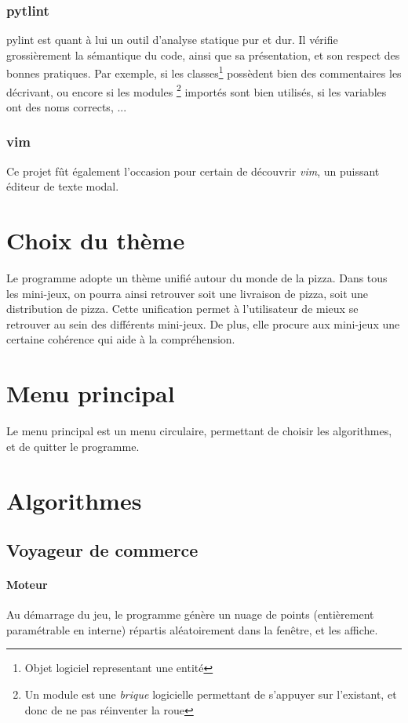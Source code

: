         \subsubsection{pytlint} pylint est quant à lui un outil d'analyse
            statique pur et dur. Il vérifie grossièrement la sémantique du code,
            ainsi que sa présentation, et son respect des bonnes pratiques.
            Par exemple, si les classes\footnote{Objet logiciel representant une entité}
            possèdent bien des commentaires les décrivant, ou encore si les modules
            \footnote{Un module est une \emph{brique} logicielle permettant
            de s'appuyer sur l'existant, et donc de ne pas réinventer la roue}
            importés sont bien utilisés, si les variables ont des noms corrects, ...
        \subsubsection{vim}
            Ce projet fût également l'occasion pour certain de découvrir \emph{vim},
            un puissant éditeur de texte modal.

\section{Choix du thème}
Le programme adopte un thème unifié autour du monde de la pizza. Dans tous les mini-jeux, on pourra
ainsi retrouver soit une livraison de pizza, soit une distribution de pizza. Cette unification permet à
l'utilisateur de mieux se retrouver au sein des différents mini-jeux. De plus, elle procure aux mini-jeux
une certaine cohérence qui aide à la compréhension.

\section{Menu principal}
    Le menu principal est un menu circulaire,
    permettant de choisir les algorithmes, et de
    quitter le programme.

\section{Algorithmes}
    \subsection{Voyageur de commerce}
        \paragraph{Moteur}
            Au démarrage du jeu, le programme génère un nuage
            de points (entièrement paramétrable en interne)
            répartis aléatoirement dans la fenêtre, et les affiche.
